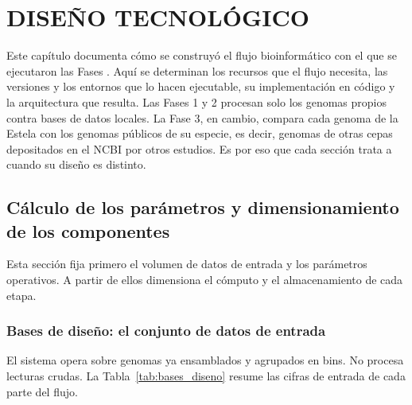\chapter{DISEÑO TECNOLÓGICO}

%

Este capítulo documenta cómo se construyó el flujo bioinformático con el que se
ejecutaron las Fases . Aquí se determinan los recursos que el flujo necesita,
las versiones y los entornos que lo hacen ejecutable, su implementación en
código y la arquitectura que resulta. Las Fases 1 y 2 procesan solo los genomas
propios contra bases de datos locales. La Fase 3, en cambio, compara cada genoma
de la Estela con los genomas públicos de su especie, es decir, genomas de otras
cepas depositados en el NCBI por otros estudios.  Es
por eso que cada sección trata a  cuando su diseño
es distinto.

\section{Cálculo de los parámetros y dimensionamiento de los componentes}

Esta sección fija primero el volumen de datos de entrada y los parámetros
operativos. A partir de ellos dimensiona el cómputo y el almacenamiento de cada
etapa.

\subsection{Bases de diseño: el conjunto de datos de entrada}

El sistema opera sobre genomas ya ensamblados y agrupados en bins. No procesa
lecturas crudas. La Tabla~\ref{tab:bases_diseno} resume las cifras de entrada
de cada parte del flujo.

